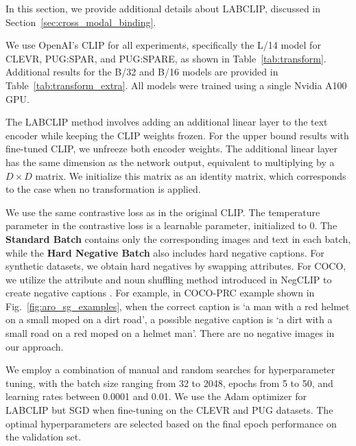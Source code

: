 In this section, we provide additional details about LABCLIP, discussed in Section~\ref{sec:cross_modal_binding}. 

We use OpenAI's CLIP for all experiments, specifically the L/14 model for CLEVR, PUG:SPAR, and PUG:SPARE, as shown in Table~\ref{tab:transform}. Additional results for the B/32 and B/16 models are provided in Table~\ref{tab:transform_extra}. All models were trained using a single Nvidia A100 GPU.

The LABCLIP method involves adding an additional linear layer to the text encoder while keeping the CLIP weights frozen. For the upper bound results with fine-tuned CLIP, we unfreeze both encoder weights. The additional linear layer has the same dimension as the network output, equivalent to multiplying by a $D \times D$ matrix. We initialize this matrix as an identity matrix, which corresponds to the case when no transformation is applied. 

We use the same contrastive loss as in the original CLIP. The temperature parameter in the contrastive loss is a learnable parameter, initialized to 0. The \textbf{Standard Batch} contains only the corresponding images and text in each batch, while the \textbf{Hard Negative Batch} also includes hard negative captions. For synthetic datasets, we obtain hard negatives by swapping attributes. For COCO, we utilize the attribute and noun shuffling method introduced in NegCLIP to create negative captions \cite{Yuksekgonul2023}. For example, in COCO-PRC example shown in Fig.~\ref{fig:aro_sg_examples}, when the correct caption is `a man with a red helmet on a small moped on a dirt road', a possible negative caption is `a dirt with a small road on a red moped on a helmet man'. There are no negative images in our approach.

We employ a combination of manual and random searches for hyperparameter tuning, with the batch size ranging from 32 to 2048, epochs from 5 to 50, and learning rates between 0.0001 and 0.01. We use the Adam optimizer for LABCLIP but SGD when fine-tuning on the CLEVR and PUG datasets. The optimal hyperparameters are selected based on the final epoch performance on the validation set.
